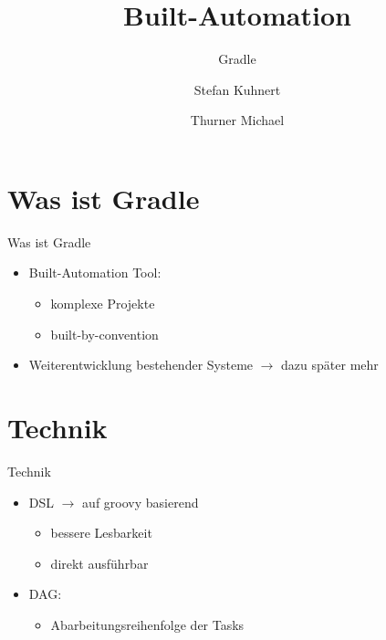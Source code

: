 \documentclass[10pt, xcolor=x11names]{beamer}			%
\title{Built-Automation}
\subtitle{Gradle}
\author[S. Kuhnert und M. Thurner]{Stefan Kuhnert \and Thurner Michael}
\begin{document}
	\frame{\maketitle}
	
	\frame{\tableofcontents}
	
	\section{Was ist Gradle}
	\begin{frame}{Was ist Gradle}
		\begin{itemize}[<+->]
			\item Built-Automation Tool:
			\begin{itemize}[<+->]
				\item komplexe Projekte
				\item built-by-convention
			\end{itemize}
			\item Weiterentwicklung bestehender Systeme \(\rightarrow\) dazu später mehr
		\end{itemize}
	\end{frame}
	
	
	\section{Technik}
	\begin{frame}{Technik}
		\begin{itemize}[<+->]
			\item DSL \(\rightarrow\) auf groovy basierend
			\begin{itemize}[<+->]
				\item bessere Lesbarkeit
				\item direkt ausführbar
			\end{itemize}
			\item DAG:
			\begin{itemize}[<+->]
				\item Abarbeitungsreihenfolge der Tasks
			\end{itemize}
		\end{itemize}
	\end{frame}
	
\end{document}
